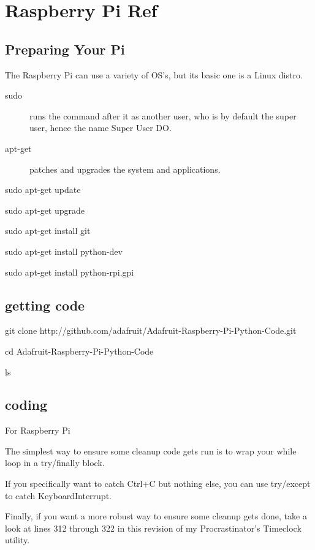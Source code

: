 \chapter{Raspberry Pi Ref}\label{chapter:RPiRef}

\section{Preparing Your Pi}

The Raspberry Pi can use a variety of OS's, but its basic one is a Linux distro.

\begin{description}
  \item[sudo] runs the command after it as another user, who is by default the super user, hence the name Super User DO.
  \item[apt-get] patches and upgrades the system and applications.
\end{description}

sudo apt-get update %

sudo apt-get upgrade %

sudo apt-get install git %

sudo apt-get install python-dev %

sudo apt-get install python-rpi.gpi %

\section{getting code}

git clone http://github.com/adafruit/Adafruit-Raspberry-Pi-Python-Code.git

cd Adafruit-Raspberry-Pi-Python-Code

ls

\section{coding}

For Raspberry Pi

The simplest way to ensure some cleanup code gets run is to wrap your while loop in a try/finally block.

If you specifically want to catch Ctrl+C but nothing else, you can use try/except to catch KeyboardInterrupt.

Finally, if you want a more robust way to ensure some cleanup gets done, take a look at lines 312 through 322 in this revision of my Procrastinator's Timeclock utility.

